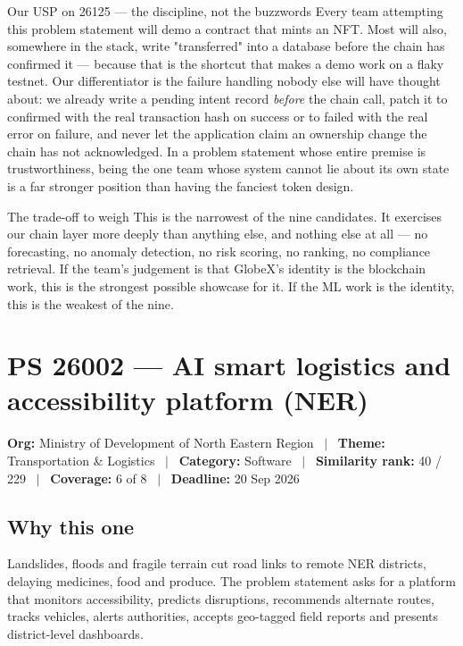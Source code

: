 \documentclass[11pt]{article}
\newcommand{\psbanner}[6]{%
  \vspace{0.2em}
  {\footnotesize\color{gxslate}\textbf{Org:} #1 \ $\vert$ \ \textbf{Theme:} #2 \ $\vert$ \ \textbf{Category:} #3 \ $\vert$ \ \textbf{Similarity rank:} #4 \ $\vert$ \ \textbf{Coverage:} #5 \ $\vert$ \ \textbf{Deadline:} #6}
  \par\vspace{0.6em}
}
\begin{document}
\begin{uspbox}{Our USP on 26125 --- the discipline, not the buzzwords}
Every team attempting this problem statement will demo a contract that mints an NFT. Most will also,
somewhere in the stack, write "transferred" into a database before the chain has confirmed it --- because
that is the shortcut that makes a demo work on a flaky testnet. Our differentiator is the failure
handling nobody else will have thought about: we already write a pending intent record \emph{before} the
chain call, patch it to confirmed with the real transaction hash on success or to failed with the real
error on failure, and never let the application claim an ownership change the chain has not
acknowledged. In a problem statement whose entire premise is trustworthiness, being the one team whose
system cannot lie about its own state is a far stronger position than having the fanciest token design.
\end{uspbox}

\begin{warnbox}{The trade-off to weigh}
This is the narrowest of the nine candidates. It exercises our chain layer more deeply than anything
else, and nothing else at all --- no forecasting, no anomaly detection, no risk scoring, no ranking, no
compliance retrieval. If the team's judgement is that GlobeX's identity is the blockchain work, this is
the strongest possible showcase for it. If the ML work is the identity, this is the weakest of the nine.
\end{warnbox}

\clearpage
\section{PS 26002 --- AI smart logistics and accessibility platform (NER)}
\psbanner{Ministry of Development of North Eastern Region}{Transportation \& Logistics}{Software}{40 / 229}{6 of 8}{20 Sep 2026}

\subsection*{Why this one}
Landslides, floods and fragile terrain cut road links to remote NER districts, delaying medicines, food
and produce. The problem statement asks for a platform that monitors accessibility, predicts disruptions,
recommends alternate routes, tracks vehicles, alerts authorities, accepts geo-tagged field reports and
presents district-level dashboards.
\end{document}
